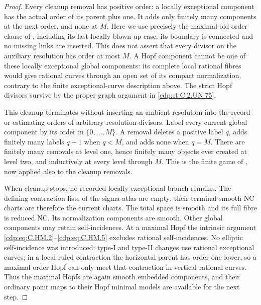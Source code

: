 \begin{proof}
Every cleanup removal has positive order:
a locally exceptional component has the
actual order of its parent plus one.  It
adds only finitely many components at the
next order, and none at \(M\).  Here we
use precisely the maximal-old-order clause
of \cite[\S8]{Kulikov1981}, including its
last-locally-blown-up case: its boundary
is connected and no missing links are
inserted.  This does not assert that
every divisor on the auxiliary resolution
has order at most \(M\).  A Hopf
component cannot be one of these locally
exceptional global components: its complete
local rational fibres would give rational
curves through an open set of its compact
normalization, contrary to the finite
exceptional-curve description above.
The strict Hopf divisors survive by the
proper graph argument in \ref{cdp:st:C.2.UN.75}.

This cleanup terminates without inserting an
ambient resolution into the record or estimating
orders of
arbitrary resolution divisors.  Label every
current global component by its order in
\(\{0,\ldots,M\}\).  A removal deletes a
positive label \(q\), adds finitely many
labels \(q+1\) when \(q<M\), and adds none
when \(q=M\).  There are finitely many
removals at level one, hence finitely many
objects ever created at level two, and
inductively at every level through \(M\).
This is the finite game of
\cite[\S9]{Kulikov1981}, now applied also
to the cleanup removals.

When cleanup stops, no recorded locally
exceptional branch remains.  The defining
contraction lists of the sigma-atlas are
empty; their terminal smooth NC charts
are therefore the current charts.
The total space is smooth and its full
fibre is reduced NC.  Its normalization
components are smooth.  Other global
components may retain self-incidences.
At a maximal Hopf the intrinsic argument
\eqref{cdp:eq:C.HM.2}--\eqref{cdp:eq:C.HM.5} excludes rational
self-incidences.  No elliptic self-incidence
was introduced: type-I and type-II changes
use rational exceptional curves; in a
local ruled contraction the horizontal
parent has order one lower, so a
maximal-order Hopf can only meet that
contraction in vertical rational curves.
Thus the maximal Hopfs are again smooth
embedded components, and their ordinary
point maps to their Hopf minimal models
are available for the next step.


\end{proof}
